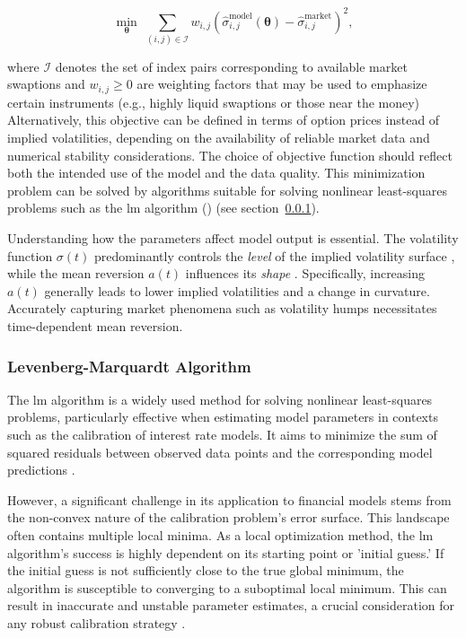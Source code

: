 \begin{equation}
	\min_{\boldsymbol{\theta}} \; \sum_{(i,j) \in \mathcal{I}} w_{i,j} \left( \hat{\sigma}^{\text{model}}_{i,j}(\boldsymbol{\theta}) - \hat{\sigma}^{\text{market}}_{i,j} \right)^2,
\end{equation}

where $\mathcal{I}$ denotes the set of index pairs corresponding to available market swaptions and $w_{i,j} \geq 0$ are weighting factors that may be used to emphasize certain instruments (e.g., highly liquid swaptions or those near the money)  Alternatively, this objective can be defined in terms of option prices instead of implied volatilities, depending on the availability of reliable market data and numerical stability considerations. The choice of objective function should reflect both the intended use of the model and the data quality. This minimization problem can be solved by algorithms suitable for solving nonlinear least-squares problems such as the \ac{lm} algorithm (\parencite{vollrath2009calibration}) (see section~\ref{lm_algorithm}).

Understanding how the parameters affect model output is essential. The volatility function $\sigma(t)$ predominantly controls the \emph{level} of the implied volatility surface \parencite[p.~9]{gurrieri2009calibration}, while the mean reversion $a(t)$ influences its \emph{shape} \parencite[p.~9]{gurrieri2009calibration}. Specifically, increasing $a(t)$ generally leads to lower implied volatilities and a change in curvature. Accurately capturing market phenomena such as volatility humps necessitates time-dependent mean reversion.

\subsubsection{Levenberg-Marquardt Algorithm} \label{lm_algorithm}
The \ac{lm} algorithm is a widely used method for solving nonlinear least-squares problems, particularly effective when estimating model parameters in contexts such as the calibration of interest rate models. It aims to minimize the sum of squared residuals between observed data points and the corresponding model predictions \parencite{marquardt1963}.

However, a significant challenge in its application to financial models stems from the non-convex nature of the calibration problem's error surface. This landscape often contains multiple local minima. As a local optimization method, the \ac{lm} algorithm's success is highly dependent on its starting point or 'initial guess.' If the initial guess is not sufficiently close to the true global minimum, the algorithm is susceptible to converging to a suboptimal local minimum. This can result in inaccurate and unstable parameter estimates, a crucial consideration for any robust calibration strategy \parencite{lui2019nnfinancialmodelcalibration}.

